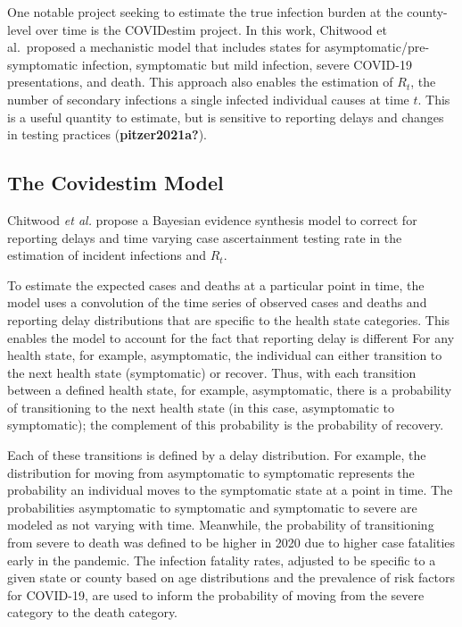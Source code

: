 \documentclass[12pt,twoside]{smiththesis}
\begin{document}
One notable project seeking to estimate the true infection burden at the county-level over time is the COVIDestim project. In this work, Chitwood et al.~proposed a mechanistic model that includes states for asymptomatic/pre-symptomatic infection, symptomatic but mild infection, severe COVID-19 presentations, and death. This approach also enables the estimation of \(R_t\), the number of secondary infections a single infected individual causes at time \(t\). This is a useful quantity to estimate, but is sensitive to reporting delays and changes in testing practices (\textbf{pitzer2021a?}).

\hypertarget{the-covidestim-model}{%
\subsection{The Covidestim Model}\label{the-covidestim-model}}

Chitwood \emph{et al.} propose a Bayesian evidence synthesis model to correct for reporting delays and time varying case ascertainment testing rate in the estimation of incident infections and \(R_t\).

To estimate the expected cases and deaths at a particular point in time, the model uses a convolution of the time series of observed cases and deaths and reporting delay distributions that are specific to the health state categories. This enables the model to account for the fact that reporting delay is different For any health state, for example, asymptomatic, the individual can either transition to the next health state (symptomatic) or recover. Thus, with each transition between a defined health state, for example, asymptomatic, there is a probability of transitioning to the next health state (in this case, asymptomatic to symptomatic); the complement of this probability is the probability of recovery.

Each of these transitions is defined by a delay distribution. For example, the distribution for moving from asymptomatic to symptomatic represents the probability an individual moves to the symptomatic state at a point in time. The probabilities asymptomatic to symptomatic and symptomatic to severe are modeled as not varying with time. Meanwhile, the probability of transitioning from severe to death was defined to be higher in 2020 due to higher case fatalities early in the pandemic. The infection fatality rates, adjusted to be specific to a given state or county based on age distributions and the prevalence of risk factors for COVID-19, are used to inform the probability of moving from the severe category to the death category.
\end{document}
